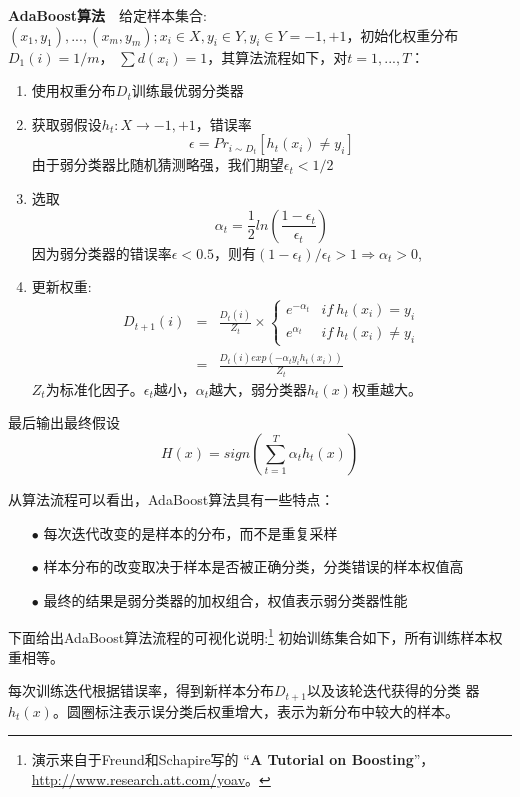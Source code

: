 \textbf{AdaBoost算法}~~给定样本集合:
$(x_1,y_1),...,(x_m,y_m);x_i\in{}X,y_i\in{}Y,y_i\in{}Y={-1,+1}$，初始化权重分布$D_1(i)=1/m$，
$\sum{}d(x_i)=1$，其算法流程如下，对$t=1,...,T$：
\begin{enumerate}
\item 使用权重分布$D_t$训练最优弱分类器
\item 获取弱假设$h_t:X\to{-1,+1}$，错误率\[\epsilon=Pr_{i\sim{}D_t}[h_t(x_i)\neq{}y_i]\]
    由于弱分类器比随机猜测略强，我们期望$\epsilon_t<1/2$
\item 选取\[\alpha_t=\frac{1}{2}ln\left(\frac{1-\epsilon_t}{\epsilon_t}\right)\]
    因为弱分类器的错误率$\epsilon<0.5$，则有$(1-\epsilon_t)/\epsilon_t>1\Rightarrow\alpha_t>0$,
\item 更新权重:
    \begin{eqnarray*}
        D_{t+1}(i)&=&\frac{D_t(i)}{Z_t}\times\left\{\begin{array}{ll}
            e^{-\alpha_t}&if~h_t(x_i)=y_i\\
            e^{\alpha_t}&if~h_t(x_i)\neq{}y_i
    \end{array}\right.\\
    {}&=&\frac{D_t(i)exp(-\alpha_ty_ih_t(x_i))}{Z_t}
\end{eqnarray*}
$Z_t$为标准化因子。$\epsilon_t$越小，$\alpha_t$越大，弱分类器$h_t(x)$权重越大。
\end{enumerate}

最后输出最终假设\[H(x)=sign\left(\sum_{t=1}^T\alpha_th_t(x)\right)\]

从算法流程可以看出，AdaBoost算法具有一些特点：
\begin{enumerate}
\item[$\bullet$] 每次迭代改变的是样本的分布，而不是重复采样
\item[$\bullet$] 样本分布的改变取决于样本是否被正确分类，分类错误的样本权值高
\item[$\bullet$] 最终的结果是弱分类器的加权组合，权值表示弱分类器性能
\end{enumerate}

下面给出AdaBoost算法流程的可视化说明:\footnote{演示来自于Freund和Schapire写的
``\textbf{A Tutorial on Boosting}''，\url{http://www.research.att.com/yoav}。}
初始训练集合如下，所有训练样本权重相等。

每次训练迭代根据错误率，得到新样本分布$D_{t+1}$以及该轮迭代获得的分类
器$h_t(x)$。圆圈标注表示误分类后权重增大，表示为新分布中较大的样本。

